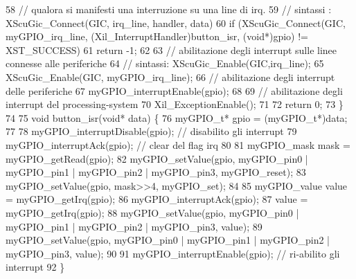 \begin{DoxyCode}
58     // qualora si manifesti una interruzione su una line di irq.
59     // sintassi : XScuGic\_Connect(GIC, irq\_line, handler, data)
60     if (XScuGic\_Connect(GIC, myGPIO\_irq\_line, (Xil\_InterruptHandler)button\_isr, (void*)gpio) !=
       XST\_SUCCESS)
61         return -1;
62 
63     // abilitazione degli interrupt sulle linee connesse alle periferiche
64     // sintassi: XScuGic\_Enable(GIC,irq\_line);
65     XScuGic\_Enable(GIC, myGPIO\_irq\_line);
66     // abilitazione degli interrupt delle periferiche
67     myGPIO\_interruptEnable(gpio);
68 
69     // abilitazione degli interrupt del processing-system
70     Xil\_ExceptionEnable();
71 
72     return 0;
73 \}
74 
75 void button\_isr(void* data) \{
76     myGPIO\_t* gpio = (myGPIO\_t*)data;
77 
78     myGPIO\_interruptDisable(gpio);  // disabilito gli interrupt
79     myGPIO\_interruptAck(gpio);      // clear del flag irq
80 
81     myGPIO\_mask mask = myGPIO\_getRead(gpio);
82     myGPIO\_setValue(gpio, myGPIO\_pin0 | myGPIO\_pin1 | myGPIO\_pin2 | myGPIO\_pin3, myGPIO\_reset);
83     myGPIO\_setValue(gpio, mask>>4, myGPIO\_set);
84 
85     myGPIO\_value value = myGPIO\_getIrq(gpio);
86     myGPIO\_interruptAck(gpio);
87     value = myGPIO\_getIrq(gpio);
88     myGPIO\_setValue(gpio, myGPIO\_pin0 | myGPIO\_pin1 | myGPIO\_pin2 | myGPIO\_pin3, value);
89     myGPIO\_setValue(gpio, myGPIO\_pin0 | myGPIO\_pin1 | myGPIO\_pin2 | myGPIO\_pin3, value);
90 
91     myGPIO\_interruptEnable(gpio);   // ri-abilito gli interrupt
92 \}
\end{DoxyCode}
 
